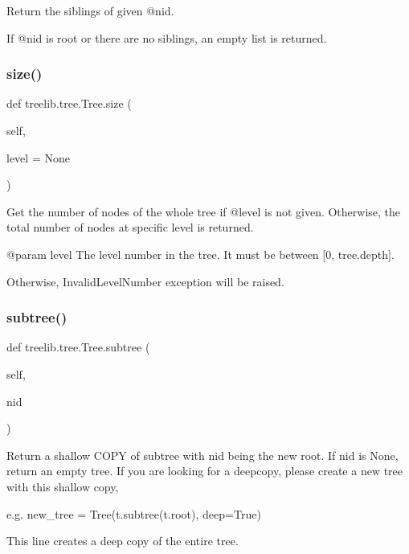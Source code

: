 \begin{DoxyVerb}Return the siblings of given @nid.

If @nid is root or there are no siblings, an empty list is returned.
\end{DoxyVerb}
 \mbox{\label{classtreelib_1_1tree_1_1Tree_aae6f22415766812580d66979c19966e0}} 
\subsubsection{\texorpdfstring{size()}{size()}}
{\footnotesize\ttfamily def treelib.\+tree.\+Tree.\+size (\begin{DoxyParamCaption}\item[{}]{self,  }\item[{}]{level = {\ttfamily None} }\end{DoxyParamCaption})}

\begin{DoxyVerb}Get the number of nodes of the whole tree if @level is not
given. Otherwise, the total number of nodes at specific level
is returned.

@param level The level number in the tree. It must be between
[0, tree.depth].

Otherwise, InvalidLevelNumber exception will be raised.
\end{DoxyVerb}
 \mbox{\label{classtreelib_1_1tree_1_1Tree_ad460737959269e893cd982c5b671da8e}} 
\subsubsection{\texorpdfstring{subtree()}{subtree()}}
{\footnotesize\ttfamily def treelib.\+tree.\+Tree.\+subtree (\begin{DoxyParamCaption}\item[{}]{self,  }\item[{}]{nid }\end{DoxyParamCaption})}

\begin{DoxyVerb}Return a shallow COPY of subtree with nid being the new root.
If nid is None, return an empty tree.
If you are looking for a deepcopy, please create a new tree
with this shallow copy,

e.g.
    new_tree = Tree(t.subtree(t.root), deep=True)

This line creates a deep copy of the entire tree.
\end{DoxyVerb}
 \mbox{\label{classtreelib_1_1tree_1_1Tree_ae50b498b092788a6e7e365cca925d4b8}} 
